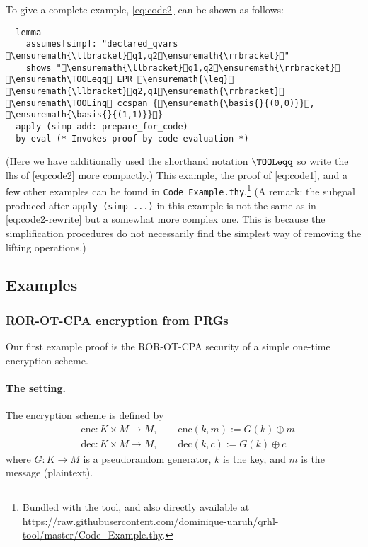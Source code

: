 \documentclass{article}
\newcommand\giturl[1]{\url{https://raw.githubusercontent.com/dominique-unruh/qrhl-tool/master/#1}}
\begin{document}
To give a complete example, \eqref{eq:code2} can be shown as follows:
\begin{lstlisting}
  lemma
    assumes[simp]: "declared_qvars \ensuremath{\llbracket}q1,q2\ensuremath{\rrbracket}"
    shows "\ensuremath{\llbracket}q1,q2\ensuremath{\rrbracket} \ensuremath\TOOLeqq EPR \ensuremath{\leq} \ensuremath{\llbracket}q2,q1\ensuremath{\rrbracket} \ensuremath\TOOLinq ccspan {\ensuremath{\basis{}{(0,0)}}, \ensuremath{\basis{}{(1,1)}}}
  apply (simp add: prepare_for_code)
  by eval (* Invokes proof by code evaluation *)
\end{lstlisting}
(Here we have additionally used the shorthand notation $\TOOLeqq$ so write the lhs of \eqref{eq:code2} more compactly.)
This example, the proof of \eqref{eq:code1}, and a few other examples
can be found in \texttt{Code\_Example.thy}.\footnote{Bundled with the
  tool, and also directly available at \giturl{Code\_Example.thy}.}  (A
remark: the subgoal produced after \texttt{apply (simp ...)} in this
example is not the same as in \eqref{eq:code2-rewrite} but a somewhat
more complex one. This is because the simplification procedures do
not necessarily find the simplest way of removing the lifting operations.)

\subsection{Examples}

\newcommand\filelist[2]{\noindent\framebox{\textbf{#1 -- \texttt{#2}}}\par}

\newcommand\qrhlfile[1]{\filelist{qRHL proof script}{#1.qrhl}}
\newcommand\isafile[1]{\filelist{Isabelle/HOL theory}{#1.thy}}

\subsubsection{ROR-OT-CPA encryption from PRGs}
\label{sec:ex.ror}

Our first example proof is the ROR-OT-CPA security of a simple
one-time encryption scheme.


\paragraph{The setting.} The encryption scheme is defined by
\begin{align*}
  &\mathrm{enc}:K\times M\to M,\qquad
  \mathrm{enc}(k,m) := G(k)\oplus m \\
  &\mathrm{dec}:K\times M\to M,\qquad
  \mathrm{dec}(k,c) := G(k)\oplus c
\end{align*}
where $G:K\to M$
is a pseudorandom generator, $k$
is the key, and $m$
is the message (plaintext). 
\end{document}
